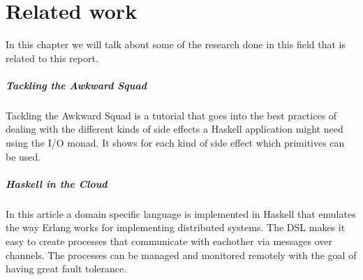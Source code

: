 \chapter{Related work}

In this chapter we will talk about some of the research done in this field that is related to this report.

\paragraph{Tackling the Awkward Squad\cite{Jones02tacklingthe}}
Tackling the Awkward Squad is a tutorial that goes into the best practices of dealing with the different kinds of side effects a Haskell application might need using the I/O monad. It shows for each kind of side effect which primitives can be used.

\paragraph{Haskell in the Cloud\cite{epstein_haskell_????}}
In this article a domain specific language is implemented in Haskell that emulates the way Erlang works for implementing distributed systems. The DSL makes it easy to create processes that communicate with eachother via messages over channels. The processes can be managed and monitored remotely with the goal of having great fault tolerance. 
